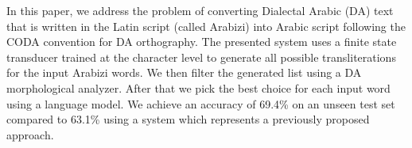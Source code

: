 In this paper, we address the problem of converting Dialectal Arabic (DA) text that is written in the Latin script (called Arabizi) into Arabic script following the CODA convention for DA orthography. The presented system uses a finite state transducer trained at the character level to generate all possible transliterations for the input Arabizi words. We then filter the generated list using a DA morphological analyzer. After that we pick the best choice for each input word using a language model. We achieve an accuracy of 69.4\% on an unseen test set compared to 63.1\% using a system which represents a previously proposed approach.
